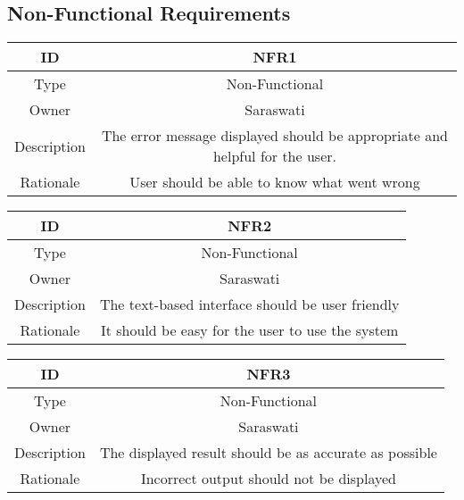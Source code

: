 \documentclass[a4paper,12pt]{article}
\begin{document}
        \subsection{Non-Functional Requirements}
        \begin{center}
        \begin{tabular}{||c c||} 
         \hline
         ID & NFR1 \\ 
         \hline
         Type & Non-Functional \\
         \hline
         Owner & Saraswati \\
         \hline
         Description & The error message displayed should be appropriate and helpful for the user. \\
         \hline
         Rationale & User should be able to know what went wrong \\
         \hline
        \end{tabular}
        \end{center}
        
        \begin{center}
        \begin{tabular}{||c c||} 
         \hline
         ID & NFR2 \\ 
         \hline
         Type & Non-Functional \\
         \hline
         Owner & Saraswati \\
         \hline
         Description & The text-based interface should be user friendly \\
         \hline
         Rationale & It should be easy for the user to use the system \\
         \hline
        \end{tabular}
        \end{center}
        
        \begin{center}
        \begin{tabular}{||c c||} 
         \hline
         ID & NFR3 \\ 
         \hline
         Type & Non-Functional \\
         \hline
         Owner & Saraswati \\
         \hline
         Description & The displayed result should be as accurate as possible \\
         \hline
         Rationale & Incorrect output should not be displayed \\
         \hline
        \end{tabular}
        \end{center}
        
\end{document}
